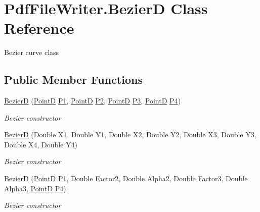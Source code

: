 \hypertarget{class_pdf_file_writer_1_1_bezier_d}{}\section{Pdf\+File\+Writer.\+BezierD Class Reference}
\label{class_pdf_file_writer_1_1_bezier_d}


Bezier curve class  


\subsection*{Public Member Functions}
\begin{DoxyCompactItemize}
\item 
\hyperlink{class_pdf_file_writer_1_1_bezier_d_a1f63d238a58c728ecd45d2fc3ab8dec1}{BezierD} (\hyperlink{class_pdf_file_writer_1_1_point_d}{PointD} \hyperlink{class_pdf_file_writer_1_1_bezier_d_a28c51951f0b0103c5fe4fc41aef00d1f}{P1}, \hyperlink{class_pdf_file_writer_1_1_point_d}{PointD} \hyperlink{class_pdf_file_writer_1_1_bezier_d_a57c96ae6696f9c6c37536049299a65f5}{P2}, \hyperlink{class_pdf_file_writer_1_1_point_d}{PointD} \hyperlink{class_pdf_file_writer_1_1_bezier_d_a46c2ce81205a167e07de37b604190ac7}{P3}, \hyperlink{class_pdf_file_writer_1_1_point_d}{PointD} \hyperlink{class_pdf_file_writer_1_1_bezier_d_a7e4ba1d387a6f241715c69a5ca78e574}{P4})
\begin{DoxyCompactList}\small\item\em Bezier constructor \end{DoxyCompactList}\item 
\hyperlink{class_pdf_file_writer_1_1_bezier_d_a69bde1dd870fd39346dbd6ae2aef1314}{BezierD} (Double X1, Double Y1, Double X2, Double Y2, Double X3, Double Y3, Double X4, Double Y4)
\begin{DoxyCompactList}\small\item\em Bezier constructor \end{DoxyCompactList}\item 
\hyperlink{class_pdf_file_writer_1_1_bezier_d_ab7776f7a617da7363fb0f4e2f8aa8b38}{BezierD} (\hyperlink{class_pdf_file_writer_1_1_point_d}{PointD} \hyperlink{class_pdf_file_writer_1_1_bezier_d_a28c51951f0b0103c5fe4fc41aef00d1f}{P1}, Double Factor2, Double Alpha2, Double Factor3, Double Alpha3, \hyperlink{class_pdf_file_writer_1_1_point_d}{PointD} \hyperlink{class_pdf_file_writer_1_1_bezier_d_a7e4ba1d387a6f241715c69a5ca78e574}{P4})
\begin{DoxyCompactList}\small\item\em Bezier constructor \end{DoxyCompactList}\end{DoxyCompactItemize}
